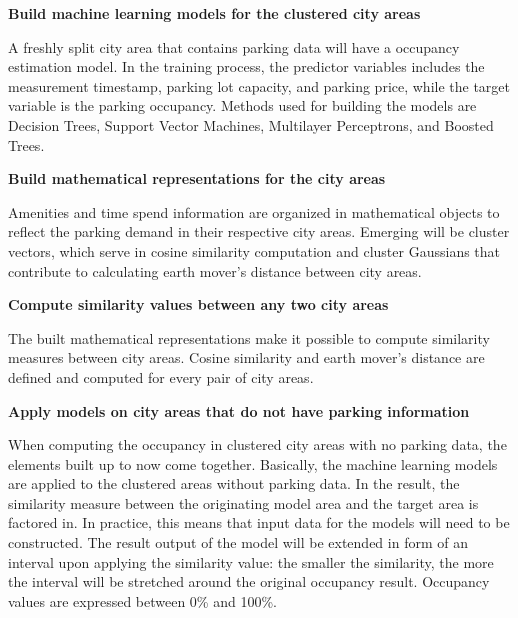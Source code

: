 \begin{romanlist}
		\item{\textbf{Build machine learning models for the clustered city areas}}
		
		A freshly split city area that contains parking data will have a occupancy estimation model. In the training process, the predictor variables includes the measurement timestamp, parking lot capacity, and parking price, while the target variable is the parking occupancy. Methods used for building the models are Decision Trees, Support Vector Machines, Multilayer Perceptrons, and Boosted Trees.
		
		\item{\textbf{Build mathematical representations for the city areas}}
		
		Amenities and time spend information are organized in mathematical objects to reflect the parking demand in their respective city areas. Emerging will be cluster vectors, which serve in cosine similarity computation and cluster Gaussians that contribute to calculating earth mover's distance between city areas.

		\item{\textbf{Compute similarity values between any two city areas}}
		
		The built mathematical representations make it possible to compute similarity measures between city areas. Cosine similarity and earth mover's distance are defined and computed for every pair of city areas.
		
		\item{\textbf{Apply models on city areas that do not have parking information}}
		
		When computing the occupancy in clustered city areas with no parking data, the elements built up to now come together. Basically, the machine learning models are applied to the clustered areas without parking data. In the result, the similarity measure between the originating model area and the target area is factored in. In practice, this means that input data for the models will need to be constructed. The result output of the model will be extended in form of an interval upon applying the similarity value: the smaller the similarity, the more the interval will be stretched around the original occupancy result. Occupancy values are expressed between 0\% and 100\%.
		
	\end{romanlist}
	
